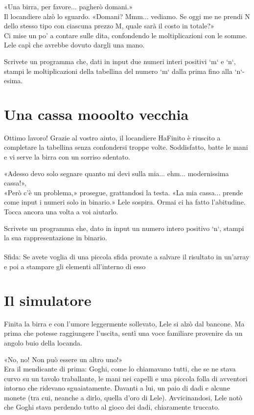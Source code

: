 \documentclass[a4paper]{article}
\begin{document}
«Una birra, per favore... pagherò domani.»\\
Il locandiere alzò lo sguardo. «Domani? Mmm... vediamo. Se oggi me ne prendi N dello stesso tipo con ciascuna prezzo M, quale sarà il costo in totale?»\\
Ci mise un po’ a contare sulle dita, confondendo le moltiplicazioni con le somme.
Lele capì che avrebbe dovuto dargli una mano.

Scrivete un programma che, dati in input due numeri interi positivi `m` e `n`, stampi le moltiplicazioni della tabellina del numero `m` dalla prima fino alla `n`-esima.

\section*{Una cassa mooolto vecchia}
Ottimo lavoro! Grazie al vostro aiuto, il locandiere HaFinito è riuscito a completare la tabellina senza confondersi troppe volte. Soddisfatto, batte le mani e vi serve la birra con un sorriso sdentato.

«Adesso devo solo segnare quanto mi devi sulla mia... ehm... modernissima cassa!»,\\
«Però c'è un problema,» prosegue, grattandosi la testa. «La mia cassa... prende come input i numeri solo in binario.»
Lele sospira. Ormai ci ha fatto l’abitudine. Tocca ancora una volta a voi aiutarlo.

Scrivete un programma che, dato in input un numero intero positivo `n`, stampi la sua rappresentazione in binario.\\
\\
Sfida: Se avete voglia di una piccola sfida provate a salvare il risultato in un'array e poi a stampare gli elementi all'interno di esso

\section*{Il simulatore}
Finita la birra e con l’umore leggermente sollevato, Lele si alzò dal bancone. Ma prima che potesse raggiungere l’uscita, sentì una voce familiare provenire da un angolo buio della locanda.

«No, no! Non può essere un altro uno!»\\
Era il mendicante di prima: Goghi, come lo chiamavano tutti, che se ne stava curvo su un tavolo traballante, le mani nei capelli e una piccola folla di avventori intorno che ridevano sguaiatamente. Davanti a lui, un paio di dadi e alcune monete (tra cui, neanche a dirlo, quella d’oro di Lele).
Avvicinandosi, Lele notò che Goghi stava perdendo tutto al gioco dei dadi, chiaramente truccato.
\end{document}
